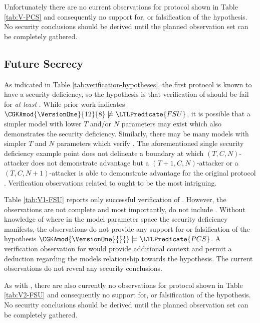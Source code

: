 Unfortunately there are no current observations for protocol \VersionTwo shown in Table \ref{tab:V-PCS} and consequently no support for, or falsification of the hypothesis.
No security conclusions should be derived until the planned observation set can be completely gathered. 


\hypertarget{future-secrecy}{%
\subsection{Future Secrecy}\label{future-secrecy}}

As indicated in Table \ref{tab:verification-hypotheses}, the first protocol \VersionOne is known to have a  security deficiency, so the hypothesis is that verification of  should be fail for \emph{at least} .
While prior work \autocite{alwen2020security} indicates \( \CGKAmod{\VersionOne}{12}{8} \not \models \LTLPredicate{FSU} \), it is possible that a simpler model with lower \(T\) and/or \(N\) parameters may exist which also demonstrates the  security deficiency.
Similarly, there may be many  models with simpler \(T\) and \(N\) parameters which verify .
The aforementioned single  security deficiency example point does not delineate a boundary at which \((T, C, N)\)-attacker does not demonstrate advantage but a \((T+1, C, N)\)-attacker or a \((T, C, N+1)\)-attacker is able to demonstrate advantage for the original protocol \VersionOne.
Verification observations related to  ought to be the most intriguing.

Table \ref{tab:V1-FSU} reports only successful verification of .
However, the observations are not complete and most importantly, do not include .
Without knowledge of where in the  model parameter space the  security deficiency manifests, the observations do not provide any support for or falsification of the hypothesis \( \CGKAmod{\VersionOne}{}{} \models \LTLPredicate{PCS} \).
A verification observation for  would provide additional context and permit a deduction regarding the models relationship towards the hypothesis.
The current observations do not reveal any security conclusions.

As with , there are also currently no  observations for protocol \VersionTwo shown in Table \ref{tab:V2-FSU} and consequently no support for, or falsification of the hypothesis.
No security conclusions should be derived until the planned observation set can be completely gathered.
